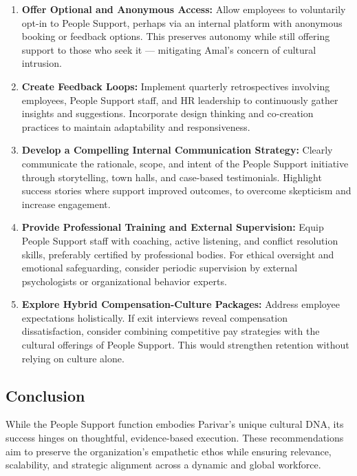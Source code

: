 \documentclass[10pt,a4paper]{book}
\begin{document}
\begin{enumerate}
    \item \textbf{Offer Optional and Anonymous Access:}
    Allow employees to voluntarily opt-in to People Support, perhaps via an internal platform with anonymous booking or feedback options. This preserves autonomy while still offering support to those who seek it — mitigating Amal’s concern of cultural intrusion.

    \item \textbf{Create Feedback Loops:}
    Implement quarterly retrospectives involving employees, People Support staff, and HR leadership to continuously gather insights and suggestions. Incorporate design thinking and co-creation practices to maintain adaptability and responsiveness.

    \item \textbf{Develop a Compelling Internal Communication Strategy:}
    Clearly communicate the rationale, scope, and intent of the People Support initiative through storytelling, town halls, and case-based testimonials. Highlight success stories where support improved outcomes, to overcome skepticism and increase engagement.

    \item \textbf{Provide Professional Training and External Supervision:}
    Equip People Support staff with coaching, active listening, and conflict resolution skills, preferably certified by professional bodies. For ethical oversight and emotional safeguarding, consider periodic supervision by external psychologists or organizational behavior experts.

    \item \textbf{Explore Hybrid Compensation-Culture Packages:}
    Address employee expectations holistically. If exit interviews reveal compensation dissatisfaction, consider combining competitive pay strategies with the cultural offerings of People Support. This would strengthen retention without relying on culture alone.

\end{enumerate}

\subsection*{Conclusion}

While the People Support function embodies Parivar’s unique cultural DNA, its success hinges on thoughtful, evidence-based execution. These recommendations aim to preserve the organization’s empathetic ethos while ensuring relevance, scalability, and strategic alignment across a dynamic and global workforce.
\end{document}
